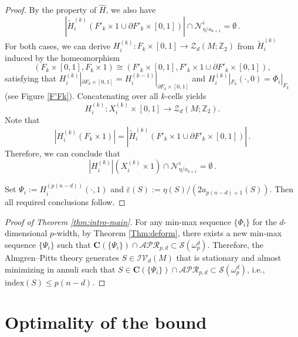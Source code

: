\documentclass[12pt,english]{article}
\theoremstyle{definition}
\begin{document}
\begin{proof}
By the property of $\hat H$, we also have
\begin{equation*}
    |\tilde H^{(k)}_i(F'_k \times 1 \cup \partial F'_k \times [0, 1])| \cap \mathcal{N}^i_{\eta / a_{k + 1}} = \emptyset\,.
\end{equation*}
For both cases, we can derive $H^{(k)}_i: F_k \times [0, 1] \rightarrow \mathcal{Z}_d(M; \mathbb{Z}_2)$ from $\tilde{H}^{(k)}_i$ induced by the homeomorphism 
\begin{equation*}
    (F_k \times [0,1], F_k \times 1) \cong (F'_k \times [0,1], F'_k \times 1 \cup \partial F'_k \times [0,1]),
\end{equation*}
satisfying that $H^{(k)}_i|_{\partial F_k \times [0,1]} = H^{(k-1)}_i|_{\partial F_k \times [0,1]}$ and $H^{(k)}_i|_{F_k}(\cdot, 0) = \Phi_i|_{F_k}$ (see Figure \ref{F'Fk}). Concatenating over all \(k\)-cells yields
\begin{equation*}
    H^{(k)}_i: X^{(k)}_i \times [0,1] \rightarrow \mathcal{Z}_d(M; \mathbb{Z}_2).
\end{equation*}
Note that
\begin{equation*}
    |H^{(k)}_i(F_k \times 1)| = |\tilde H^{(k)}_i(F'_k \times 1 \cup \partial F'_k \times [0, 1])|\,.   
\end{equation*}
Therefore, we can conclude that
\begin{equation*}
    |H^{(k)}_i|(X^{(k)}_i \times 1) \cap \mathcal{N}^i_{\eta / a_{k+1}} = \emptyset\,.
\end{equation*}

Set \(\Psi_i:=H_i^{(p(n-d))}(\cdot,1)\) and \(\bar\varepsilon(S):=\eta(S)/(2a_{p(n-d)+1}(S))\). Then all required conclusions follow.
\end{proof}

\begin{proof}[Proof of Theorem \ref{thm:intro-main}]
    For any min-max sequence $\{\Phi_i\}$ for the $d$-dimensional $p$-width, by Theorem \ref{Thm:deform}, there exists a new min-max sequence $\{\Psi_i\}$ such that $\mathbf{C}(\{\Psi_i\})\cap \mathcal{APR}_{p,d} \subset \mathcal{S}(\omega^d_p)$. Therefore, the Almgren--Pitts theory generates $S \in \mathcal{IV}_d(M)$ that is stationary and almost minimizing in annuli such that $S \in \mathbf{C}(\{\Psi_i\}) \cap \mathcal{APR}_{p,d} \subset \mathcal{S}(\omega^d_p)$, i.e., $\mathrm{index}(S) \leq p(n-d)$.
\end{proof}

\section{Optimality of the bound} \label{sec-optimal}
\end{document}
